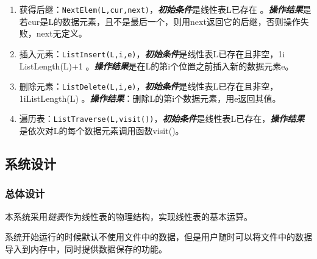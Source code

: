 \begin{enumerate}
\item 获得后继：\texttt{NextElem(L,cur,next)}，\newline \textbf{\emph{初始条件}}是线性表L已存在 。\newline \textbf{\emph{操作结果}}是若cur是L的数据元素，且不是最后一个，则用next返回它的后继，否则操作失败，next无定义。
\item 插入元素：\texttt{ListInsert(L,i,e)}，\newline \textbf{\emph{初始条件}}是线性表L已存在且非空，1\le i \le ListLength(L)+1 。\newline \textbf{\emph{操作结果}}是在L的第i个位置之前插入新的数据元素e。
\item 删除元素：\texttt{ListDelete(L,i,e)}，\newline \textbf{\emph{初始条件}}是线性表L已存在且非空，1\le i\le ListLength(L) 。\newline \textbf{\emph{操作结果}}：删除L的第i个数据元素，用e返回其值。
\item 遍历表：\texttt{ListTraverse(L,visit())}，\newline \textbf{\emph{初始条件}}是线性表L已存在，\newline \textbf{\emph{操作结果}}是依次对L的每个数据元素调用函数visit()。
\end{enumerate}
\subsection{系统设计}
\subsubsection{总体设计}
本系统采用\emph{链表}作为线性表的物理结构，实现线性表的基本运算。
\par
系统开始运行的时候默认不使用文件中的数据，但是用户随时可以将文件中的数据导入到内存中，同时提供数据保存的功能。

